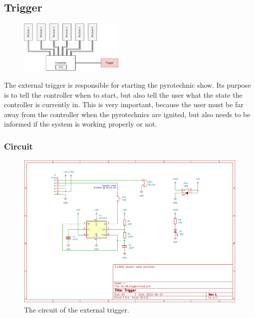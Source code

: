 \pagebreak

\subsection{Trigger}

\begin{figure}[!ht]
    \centering
    \includegraphics[width=5cm]{./Figures/concept_trigger.png} 
\end{figure}

\noindent The external trigger is responsible for starting the pyrotechnic show. Its purpose is to tell the controller when to start, but also tell the user what the state the controller is currently in. This is very important, because the user must be far away from the controller when the pyrotechnics are ignited, but also needs to be informed if the system is working properly or not.

\subsubsection{Circuit}

\begin{figure}[!ht]
    \centering
    \includegraphics[width=15cm]{./Figures/trigger_circuit.png}
    \caption{The circuit of the external trigger.}
    \label{fig:trigger_circuit}     
\end{figure}

